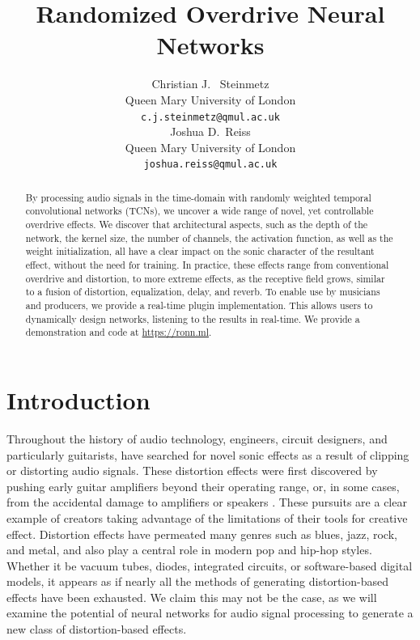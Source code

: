 \documentclass{article}
\title{Randomized Overdrive Neural Networks}
\author{%
  Christian J. ~Steinmetz \\
  Queen Mary University of London\\
  \texttt{c.j.steinmetz@qmul.ac.uk} \\
  \And
  Joshua D.~Reiss \\
  Queen Mary University of London \\
  \texttt{joshua.reiss@qmul.ac.uk} \\
}
\begin{document}
 
\maketitle
\vspace{-0.3cm}

\begin{abstract}
By processing audio signals in the time-domain with randomly weighted temporal convolutional networks (TCNs),
we uncover a wide range of novel, yet controllable overdrive effects.
We discover that architectural aspects, such as the depth of the network, 
the kernel size, the number of channels, the activation function, as well as the weight initialization, 
all have a clear impact on the sonic character of the resultant effect, without the need for training. 
In practice, these effects range from conventional overdrive and distortion,
to more extreme effects, as the receptive field grows, similar to a fusion of distortion, equalization, delay, and reverb.  
To enable use by musicians and producers, we provide a real-time plugin implementation.
This allows users to dynamically design networks, listening to the results in real-time.
We provide a demonstration and code at \url{https://ronn.ml}.
\end{abstract} 



\section{Introduction}

Throughout the history of audio technology, engineers, circuit designers, 
and particularly guitarists, have searched for novel sonic effects as a result of clipping or distorting audio signals. 
These distortion effects were first discovered by pushing early guitar amplifiers beyond their operating range, 
or, in some cases, from the accidental damage to amplifiers or speakers \cite{shepherd2003distortion}. 
These pursuits are a clear example of creators taking advantage of the limitations of their tools for creative effect.
Distortion effects have permeated many genres such as blues, jazz, rock, and metal, and also play a central role in modern pop and hip-hop styles.
Whether it be vacuum tubes, diodes, integrated circuits, or software-based digital models,
it appears as if nearly all the methods of generating distortion-based effects have been exhausted.
We claim this may not be the case, as we will examine the potential of neural networks for audio signal processing to generate a new class of distortion-based effects. 
\end{document}
